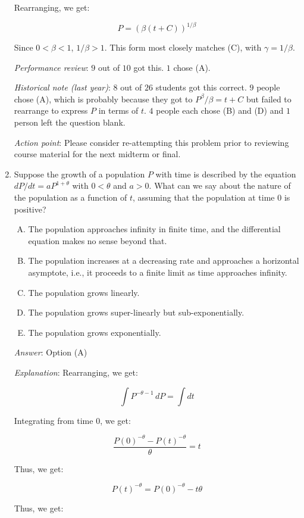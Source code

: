 \documentclass[10pt]{amsart}
\begin{document}
\begin{enumerate}
  Rearranging, we get:

  $$P = (\beta(t + C))^{1/\beta}$$

  Since $0 < \beta < 1$, $1/\beta > 1$. This form most closely matches
  (C), with $\gamma = 1/\beta$.

  {\em Performance review}: $9$ out of $10$ got this. $1$ chose (A).

  {\em Historical note (last year)}: $8$ out of $26$ students got this
  correct. $9$ people chose (A), which is probably because they got to
  $P^\beta/\beta = t + C$ but failed to rearrange to express $P$ in
  terms of $t$. $4$ people each chose (B) and (D) and $1$ person left
  the question blank.

  {\em Action point}: Please consider re-attempting this problem prior
  to reviewing course material for the next midterm or final.
\item Suppose the growth of a population $P$ with time is described by
  the equation $dP/dt = aP^{1 + \theta}$ with $0 < \theta$ and $a >
  0$. What can we say about the nature of the population as a function
  of $t$, assuming that the population at time $0$ is positive?

  \begin{enumerate}[(A)]
  \item The population approaches infinity in finite time, and the
    differential equation makes no sense beyond that.
  \item The population increases at a decreasing rate and approaches a
    horizontal asymptote, i.e., it proceeds to a finite limit as time
    approaches infinity.
  \item The population grows linearly.
  \item The population grows super-linearly but sub-exponentially.
  \item The population grows exponentially.
  \end{enumerate}

  {\em Answer}: Option (A)

  {\em Explanation}: Rearranging, we get:

  $$\int P^{-\theta - 1} \, dP = \int dt$$

  Integrating from time $0$, we get:

  $$\frac{P(0)^{-\theta} - P(t)^{-\theta}}{\theta} = t$$

  Thus, we get:

  $$P(t)^{-\theta} = P(0)^{-\theta} - t\theta$$

  Thus, we get:


\end{enumerate}
\end{document}
